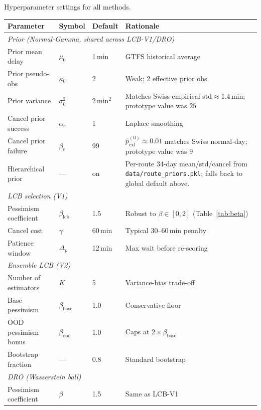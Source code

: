 \documentclass[opre,dblanonrev]{informs4}
\begin{document}
\begin{APPENDICES}
\begin{table}
\TABLE
{Hyperparameter settings for all methods.\label{tab:params}}
{\scriptsize\setlength{\tabcolsep}{3pt}\begin{tabular}{l l l p{6.0cm}}
\toprule
\textbf{Parameter} & \textbf{Symbol} & \textbf{Default} & \textbf{Rationale} \\
\midrule
\multicolumn{4}{l}{\textit{Prior (Normal-Gamma, shared across LCB-V1/DRO)}} \\
Prior mean delay     & $\mu_0$      & 1\,min  & GTFS historical average \\
Prior pseudo-obs     & $\kappa_0$   & 2       & Weak; 2 effective prior obs \\
Prior variance       & $\sigma_0^2$ & 2\,min$^2$  & Matches Swiss empirical std$\approx 1.4$\,min; prototype value was $25$ \\
Cancel prior success & $\alpha_c$   & 1       & Laplace smoothing \\
Cancel prior failure & $\beta_c$    & 99      & $\hat{p}_{\mathrm{cxl}}^{(0)}\!\approx\!0.01$ matches Swiss normal-day; prototype value was $9$ \\
Hierarchical prior  & ---          & on & Per-route 34-day mean/std/cancel from \texttt{data/route\_priors.pkl}; falls back to global default above. \\
\midrule
\multicolumn{4}{l}{\textit{LCB selection (V1)}} \\
Pessimism coefficient & $\beta_{\mathrm{lcb}}$ & 1.5 & Robust to $\beta\in[0,2]$ (Table~\ref{tab:beta}) \\
Cancel cost           & $\gamma$    & 60\,min & Typical 30--60\,min penalty \\
Patience window       & $\Delta_p$  & 12\,min & Max wait before re-scoring \\
\midrule
\multicolumn{4}{l}{\textit{Ensemble LCB (V2)}} \\
Number of estimators  & $K$         & 5       & Variance-bias trade-off \\
Base pessimism        & $\beta_{\mathrm{base}}$ & 1.0 & Conservative floor \\
OOD pessimism bonus   & $\beta_{\mathrm{ood}}$  & 1.0 & Caps at $2\times\beta_{\mathrm{base}}$ \\
Bootstrap fraction    & ---         & 0.8     & Standard bootstrap \\
\midrule
\multicolumn{4}{l}{\textit{DRO (Wasserstein ball)}} \\
Pessimism coefficient & $\beta$     & 1.5     & Same as LCB-V1 \\

\end{tabular}}
\end{table}
\end{APPENDICES}
\end{document}
